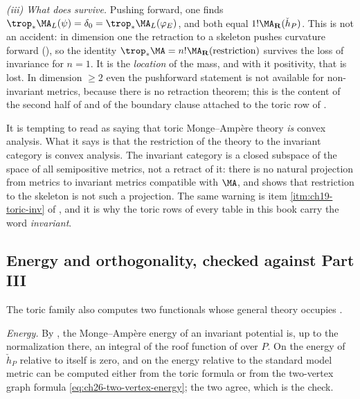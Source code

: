 \begin{example}
\emph{(iii) What does survive.}  Pushing forward, one finds
\(\trop_*\MA_L(\psi)=\delta_0=\trop_*\MA_L(\varphi_E)\), and both equal
\(1!\MA_{\mathbf R}(\check h_P)\).  This is not an accident: in dimension one
the retraction to a skeleton pushes curvature forward
(), so the identity
\(\trop_*\MA=n!\MA_{\mathbf R}(\text{restriction})\) survives the loss of
invariance for \(n=1\).  It is the \emph{location} of the mass, and with it
positivity, that is lost.  In dimension \(\geq2\) even the pushforward
statement is not available for non-invariant metrics, because there is no
retraction theorem; this is the content of the second half of
 and of the boundary clause attached to the toric
row of .
\end{example}

\begin{remark}
\label{rem:ch31-invariance-is-a-hypothesis}
It is tempting to read  as saying that toric
Monge--Amp\`ere theory \emph{is} convex analysis.  What it says is that the
restriction of the theory to the invariant category is convex analysis.  The
invariant category is a closed subspace of the space of all semipositive
metrics, not a retract of it: there is no natural projection from metrics to
invariant metrics compatible with \(\MA\), and
 shows that restriction to the skeleton is not
such a projection.  The same warning is item \cref{itm:ch19-toric-inv} of
, and it is why the toric rows of every
table in this book carry the word \emph{invariant}.
\end{remark}

\subsection{Energy and orthogonality, checked against Part III}
\label{sec:ch31-toric-energy}

The toric family also computes two functionals whose general theory occupies
.

\emph{Energy.}  By , the Monge--Amp\`ere energy
of an invariant potential is, up to the normalization there, an integral of
the roof function of  over \(P\).  On
 the energy of \(\check h_P\) relative to itself
is zero, and on  the energy relative to the
standard model metric can be computed either from the toric formula or from
the two-vertex graph formula \eqref{eq:ch26-two-vertex-energy}; the two
agree, which is the check.


